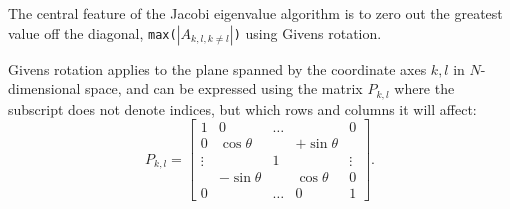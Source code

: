 \documentclass[a4paper,11pt]{article}
\begin{document}
The central feature of the Jacobi eigenvalue algorithm is to zero out the greatest value off the diagonal, \texttt{max($|A_{k,l,k\neq l}|$)} using Givens rotation.

Givens rotation applies to the plane spanned by the coordinate axes $k,l$ in $N$-dimensional space, and can be expressed using the matrix $P_{k,l}$ where the subscript does not denote indices, but which rows and columns it will affect:
\begin{equation}
    P_{k,l} =
    \begin{bmatrix}
        1   & 0         &\dots  &           & 0 \\
        0   & \cos\theta&       &+\sin\theta&   \\
    \vdots  &           &1      &           & \vdots  \\
            &-\sin\theta&       & \cos\theta& 0 \\
        0   &           &\dots  & 0         & 1
    \end{bmatrix}.
    \label{eq:givens}
\end{equation}
\end{document}
